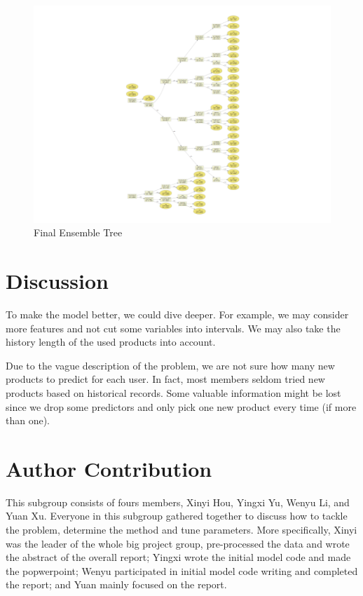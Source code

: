\documentclass{article}
\begin{document}
\begin{spacing}{1.5}
\begin{large}
\begin{figure}[H]
\centering
\includegraphics[width = 160mm]{12.png}

\caption{Final Ensemble Tree}
\end{figure}


\section{Discussion}

To make the model better, we could dive deeper. For example, we may consider more features and not cut some variables into intervals. We may also take the history length of the used products into account.

Due to the vague description of the problem, we are not sure how many new products to predict for each user. In fact, most members seldom tried new products based on historical records. Some valuable information might be lost since we drop some predictors and only pick one new product every time (if more than one).


\section{Author Contribution}

This subgroup consists of fours members, Xinyi Hou, Yingxi Yu, Wenyu Li, and Yuan Xu. Everyone in this subgroup gathered together to discuss how to tackle the problem, determine the method and tune parameters. More specifically, Xinyi was the leader of the whole big project group, pre-processed the data and wrote the abstract of the overall report; Yingxi wrote the initial model code and made the popwerpoint; Wenyu participated in initial model code writing and completed the report; and Yuan mainly focused on the report.


\end{large}
\end{spacing}
\end{document}
